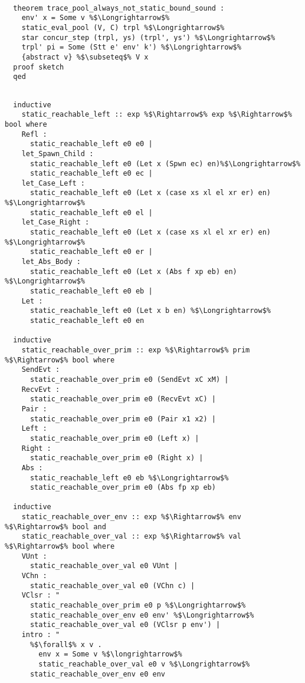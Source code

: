 \begin{lstlisting}[style=codestyle1, escapechar=\%]

  theorem trace_pool_always_not_static_bound_sound :
    env' x = Some v %$\Longrightarrow$%
    static_eval_pool (V, C) trpl %$\Longrightarrow$% 
    star concur_step (trpl, ys) (trpl', ys') %$\Longrightarrow$%
    trpl' pi = Some (Stt e' env' k') %$\Longrightarrow$%
    {abstract v} %$\subseteq$% V x
  proof sketch
  qed

  \end{lstlisting}


\begin{lstlisting}[style=codestyle1, escapechar=\%]

  inductive
    static_reachable_left :: exp %$\Rightarrow$% exp %$\Rightarrow$% bool where
    Refl :
      static_reachable_left e0 e0 | 
    let_Spawn_Child :
      static_reachable_left e0 (Let x (Spwn ec) en)%$\Longrightarrow$%
      static_reachable_left e0 ec |
    let_Case_Left :
      static_reachable_left e0 (Let x (case xs xl el xr er) en) %$\Longrightarrow$%
      static_reachable_left e0 el |
    let_Case_Right :
      static_reachable_left e0 (Let x (case xs xl el xr er) en) %$\Longrightarrow$%
      static_reachable_left e0 er |
    let_Abs_Body :
      static_reachable_left e0 (Let x (Abs f xp eb) en) %$\Longrightarrow$%
      static_reachable_left e0 eb | 
    Let :
      static_reachable_left e0 (Let x b en) %$\Longrightarrow$%
      static_reachable_left e0 en

  inductive
    static_reachable_over_prim :: exp %$\Rightarrow$% prim %$\Rightarrow$% bool where
    SendEvt :
      static_reachable_over_prim e0 (SendEvt xC xM) |
    RecvEvt :
      static_reachable_over_prim e0 (RecvEvt xC) |
    Pair :
      static_reachable_over_prim e0 (Pair x1 x2) |
    Left :
      static_reachable_over_prim e0 (Left x) |
    Right :
      static_reachable_over_prim e0 (Right x) |
    Abs :
      static_reachable_left e0 eb %$\Longrightarrow$%
      static_reachable_over_prim e0 (Abs fp xp eb) 

  inductive 
    static_reachable_over_env :: exp %$\Rightarrow$% env %$\Rightarrow$% bool and
    static_reachable_over_val :: exp %$\Rightarrow$% val %$\Rightarrow$% bool where
    VUnt :
      static_reachable_over_val e0 VUnt |
    VChn :
      static_reachable_over_val e0 (VChn c) |
    VClsr : "
      static_reachable_over_prim e0 p %$\Longrightarrow$%
      static_reachable_over_env e0 env' %$\Longrightarrow$%
      static_reachable_over_val e0 (VClsr p env') |
    intro : "
      %$\forall$% x v .
        env x = Some v %$\longrightarrow$%
        static_reachable_over_val e0 v %$\Longrightarrow$%
      static_reachable_over_env e0 env


\end{lstlisting}
